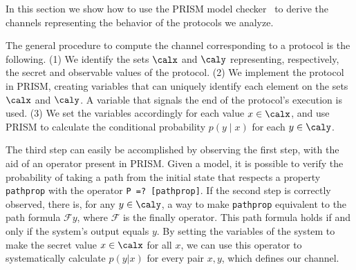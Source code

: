In this section we show how to use the PRISM model checker~\cite{PRISM}
to derive the channels representing the behavior of the protocols
we analyze. 
%

The general procedure to compute the channel corresponding to a protocol 
is the following.
(1) We identify the sets $\calx$ and $\caly$ representing, respectively, 
the secret and observable values of the protocol.
(2) We implement the protocol in PRISM, creating variables 
that can uniquely identify each element on the sets 
$\calx$ and $\caly$. 
A variable that signals the end of the protocol's execution is used.
(3) We set the variables accordingly for each value $x \in \calx$, 
and use PRISM to calculate the conditional probability $p(y \mid x)$ for 
each $y \in \caly$.

The third step can easily be accomplished by observing the first step, 
with the aid of an operator present in PRISM. 
Given a model, it is possible to verify the probability of taking a 
path from the initial state that respects a property \texttt{pathprop} 
with the operator
\texttt{P =? [pathprop]}.
If the second step is correctly observed, there is, for any $y \in \caly$, 
a way to make \texttt{pathprop} equivalent to the path formula 
$\mathcal{F} y$, where $\mathcal{F}$ is the finally operator. 
This path formula holds if and only if the system's output equals $y$. 
By setting the variables of the system to make the secret value $x \in \calx$ 
for all $x$, we can use this operator to systematically calculate $p(y|x)$ 
for every pair $x,y$, which defines our channel.

